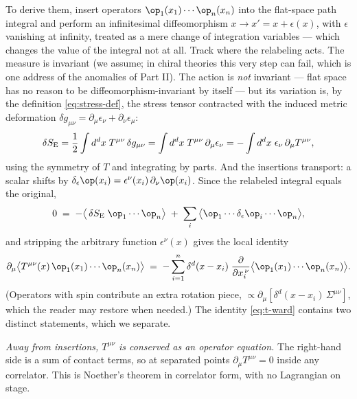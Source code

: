 To derive them, insert operators $\op_1(x_1)\cdots\op_n(x_n)$ into the flat-space path
integral and perform an infinitesimal diffeomorphism $x \to x' = x +
\epsilon(x)$, with $\epsilon$ vanishing at infinity, treated as a mere change
of integration variables --- which changes the value of the integral not at
all. Track where the relabeling acts. The measure is invariant (we assume; in
chiral theories this very step can fail, which is one address of the
anomalies of Part II). The action is \emph{not} invariant --- flat space has
no reason to be diffeomorphism-invariant by itself --- but its variation is,
by the definition \eqref{eq:stress-def}, the stress tensor contracted with
the induced metric deformation $\delta g_{\mu\nu} = \partial_\mu
\epsilon_\nu + \partial_\nu \epsilon_\mu$:
\begin{equation}
\delta S_{\rm E}
= \frac12 \int d^dx \; T^{\mu\nu}\, \delta g_{\mu\nu}
= \int d^dx \; T^{\mu\nu}\, \partial_\mu \epsilon_\nu
= -\int d^dx \; \epsilon_\nu \,\partial_\mu T^{\mu\nu} ,
\end{equation}
using the symmetry of $T$ and integrating by parts. And the insertions
transport: a scalar shifts by $\delta_\epsilon \op(x_i) =
\epsilon^\nu(x_i)\, \partial_\nu \op(x_i)$. Since the relabeled integral
equals the original,
\begin{equation}
0 \;=\; -\big\langle\, \delta S_{\rm E}\; \op_1 \cdots \op_n\big\rangle
\;+\; \sum_i \big\langle \op_1 \cdots \delta_\epsilon \op_i \cdots
\op_n\big\rangle ,
\end{equation}
and stripping the arbitrary function $\epsilon^\nu(x)$
gives the local identity
\begin{equation}
\partial_\mu \big\langle T^{\mu\nu}(x)\, \op_1(x_1)\cdots\op_n(x_n)
\big\rangle
\;=\; -\sum_{i=1}^n \delta^d(x - x_i)\;
\frac{\partial}{\partial x_i^{\,\nu}}
\big\langle \op_1(x_1) \cdots \op_n(x_n)\big\rangle .
\label{eq:t-ward}
\end{equation}
(Operators with spin contribute an extra rotation piece, $\propto
\partial_\mu[\delta^d(x - x_i)\, \Sigma^{\mu\nu}]$, which the reader may
restore when needed.) The identity \eqref{eq:t-ward} contains two distinct
statements, which we separate.

\emph{Away from insertions, $T^{\mu\nu}$ is conserved as an operator
equation.} The right-hand side is a sum of contact terms, so at separated
points $\partial_\mu T^{\mu\nu} = 0$ inside any correlator. This is Noether's
theorem in correlator form, with no Lagrangian on stage.

